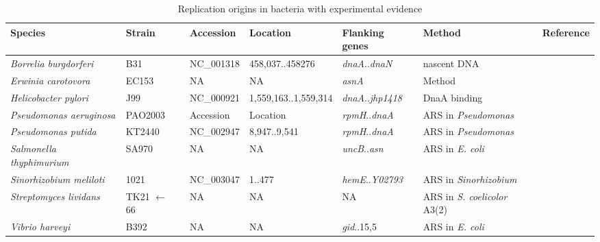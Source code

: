 \begin{table}[ht]
\begin{center}
\tiny
\begin{tabular}{lllllll}
\hline \hline
Species & Strain & Accession & Location & Flanking genes& Method & Reference\\
\hline
\textit{Borrelia burgdorferi} & B31 & NC\_001318 & 458,037..458276 & \textit{dnaA}..\textit{dnaN}& nascent DNA & \cite{PicardeauM1999}\\
\textit{Erwinia carotovora} & EC153 & NA & NA & \textit{asnA}& Method & \cite{TakedaY1982}\\
\textit{Helicobacter pylori} & J99 & NC\_000921& 1,559,163..1,559,314& \textit{dnaA}..\textit{jhp1418}& DnaA binding & \cite{ZawilakA2001}\\
\textit{Pseudomonas aeruginosa} & PAO2003 & Accession & Location & \textit{rpmH}..\textit{dnaA}& ARS in \textit{Pseudomonas} & \cite{YeeTW1990}\\
\textit{Pseudomonas putida} & KT2440 & NC\_002947 & 8,947..9,541 & \textit{rpmH}..\textit{dnaA}& ARS in \textit{Pseudomonas} & \cite{YeeTW1990}\\
\textit{Salmonella thyphimurium} & SA970 & NA & NA & \textit{uncB}..\textit{asn} & ARS in \textit{E. coli} & \cite{ZyskindJW1979, ZyskindJW1980}\\
\textit{Sinorhizobium meliloti} & 1021 & NC\_003047 & 1..477 & \textit{hemE}..\textit{Y02793} & ARS in \textit{Sinorhizobium} & \cite{SibleyCD2006}\\
\textit{Streptomyces lividans} & TK21 $\leftarrow$ 66 & NA & NA & NA & ARS in \textit{S. coelicolor} A3(2) & \cite{ZakrezewskaCzerwinskaJ1992} \\
\textit{Vibrio harveyi} & B392 & NA & NA & \textit{gid}..15,5& ARS in \textit{E. coli} & \cite{ZyskindJW1983}\\
\hline \hline
\end{tabular}
\caption{Replication origins in bacteria with experimental evidence}
\label{oriexp}
\end{center}
\end{table}
\normalsize